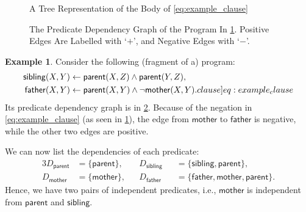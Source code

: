 \documentclass[letterpaper]{article}
\theoremstyle{definition}
\newtheorem{example}{Example}
\begin{document}
\begin{figure}
  \centering
  \caption{A Tree Representation of the Body of \cref{eq:example_clause}}
  \label{fig:example_tree2}
\end{figure}
\begin{figure}
  \centering
  \caption{The Predicate Dependency Graph of the Program In \cref{ex:program}.
    Positive Edges Are Labelled with `$+$', and Negative Edges with `$-$'.}
  \label{fig:predicate_dependencies}
\end{figure}

\begin{example} \label{ex:program}
  Consider the following (fragment of a) program:
  \begin{align}
    \mathsf{sibling}(X, Y) &\gets \mathsf{parent}(X, Z) \land \mathsf{parent}(Y, Z), \nonumber \\
    \mathsf{father}(X, Y) &\gets \mathsf{parent}(X, Y) \land \neg\mathsf{mother}(X, Y). \label[clause]{eq:example_clause}
  \end{align}
  Its predicate dependency graph is in \cref{fig:predicate_dependencies}.
  Because of the negation in \cref{eq:example_clause} (as seen in
  \cref{fig:example_tree2}), the edge from $\mathsf{mother}$ to
  $\mathsf{father}$ is negative, while the other two edges are positive.

  We can now list the dependencies of each predicate:
  \begin{alignat*}{3}
    D_{\mathsf{parent}} &= \{ \mathsf{parent} \}, && D_{\mathsf{sibling}}
    &&= \{\mathsf{sibling}, \mathsf{parent} \},\\
    D_{\mathsf{mother}} &= \{ \mathsf{mother} \}, && D_{\mathsf{father}}
    &&= \{ \mathsf{father}, \mathsf{mother}, \mathsf{parent} \}.
  \end{alignat*}
  Hence, we have two pairs of independent predicates, i.e., $\mathsf{mother}$ is
  independent from $\mathsf{parent}$ and $\mathsf{sibling}$.
\end{example}
\end{document}
